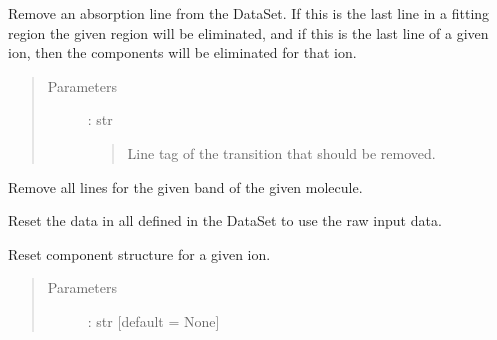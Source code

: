 \documentclass[letterpaper,10pt,english]{sphinxmanual}
\begin{document}
\begin{fulllineitems}
\begin{fulllineitems}
\label{\detokenize{api:VoigtFit.DataSet.remove_line}}
Remove an absorption line from the DataSet. If this is the last line in a fitting region
the given region will be eliminated, and if this is the last line of a given ion,
then the components will be eliminated for that ion.
\begin{quote}\begin{description}
\item[{Parameters}] \leavevmode
{} : str
\begin{quote}

Line tag of the transition that should be removed.
\end{quote}

\end{description}\end{quote}

\end{fulllineitems}


\begin{fulllineitems}
\label{\detokenize{api:VoigtFit.DataSet.remove_molecule}}
Remove all lines for the given band of the given molecule.

\end{fulllineitems}


\begin{fulllineitems}
\label{\detokenize{api:VoigtFit.DataSet.reset_all_regions}}
Reset the data in all {\hyperref[\detokenize{api:regions.Region}]{}}
defined in the DataSet to use the raw input data.

\end{fulllineitems}


\begin{fulllineitems}
\label{\detokenize{api:VoigtFit.DataSet.reset_components}}
Reset component structure for a given ion.
\begin{quote}\begin{description}
\item[{Parameters}] \leavevmode
{} : str   {[}default = None{]}
\begin{quote}


\end{quote}
\end{description}
\end{quote}
\end{fulllineitems}
\end{fulllineitems}
\end{document}
